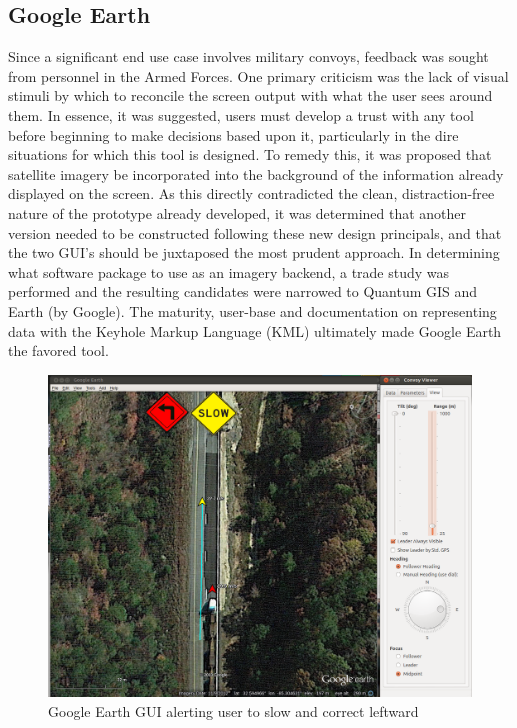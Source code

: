 \documentclass[twocolumn,10pt]{article}
\begin{document}
  \subsection*{Google Earth}

    Since a significant end use case involves military convoys, feedback was sought from personnel in the Armed Forces.  One primary criticism was the lack of visual stimuli by which to reconcile the screen output with what the user sees around them.  In essence, it was suggested, users must develop a trust with any tool before beginning to make decisions based upon it, particularly in the dire situations for which this tool is designed.  To remedy this, it was proposed that satellite imagery be incorporated into the background of the information already displayed on the screen.  As this directly contradicted the clean, distraction-free nature of the prototype already developed, it was determined that another version needed to be constructed following these new design principals, and that the two GUI's should be juxtaposed the most prudent approach. In determining what software package to use as an imagery backend, a trade study was performed and the resulting candidates were narrowed to Quantum GIS and Earth (by Google).  The maturity, user-base and documentation on representing data with the Keyhole Markup Language (KML) ultimately made Google Earth the favored tool.

    \begin{figure}[ht] \centering
      \includegraphics[width=\columnwidth] {../graphics/earth_slow.png}
      \caption{Google Earth GUI alerting user to slow and correct leftward} \label{fig:earth_alerts}
    \end{figure}
\end{document}

